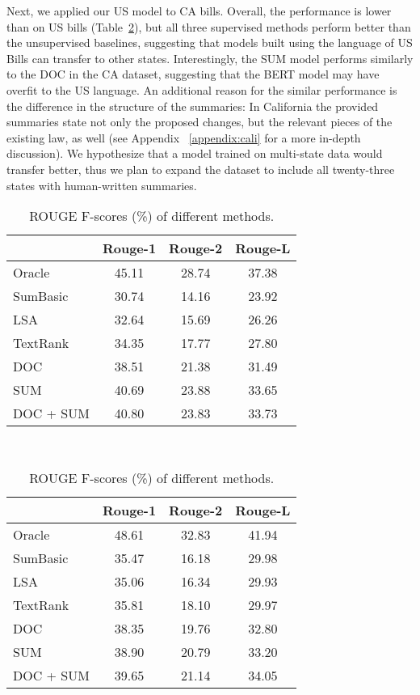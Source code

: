 \documentclass[11pt,a4paper]{article}
\begin{document}
Next, we applied our US model to CA bills. Overall, the performance is lower than on US bills (Table~\ref{tab:res:ca}), but all three supervised methods perform better than the unsupervised baselines, suggesting that models built using the language of US Bills can transfer to other states. Interestingly, the SUM model performs similarly to the DOC in the CA dataset, suggesting that the BERT model may have overfit to the US language. An additional reason for the similar performance is the difference in the structure of the summaries: In California the provided summaries state not only the proposed changes, but the relevant pieces of the existing law, as well (see Appendix ~\ref{appendix:cali} for a more in-depth discussion). We hypothesize that a model trained on multi-state data would transfer better, thus we plan to expand the dataset to include all twenty-three states with human-written summaries.

\begin{table}[h]
\caption{ROUGE F-scores (\%) of different methods.}\label{tab:res}
    \begin{tabular}{|l|c|c|c|}
    \hline
     &  Rouge-1 & Rouge-2 & Rouge-L \\ \hline
     Oracle & 45.11  & 28.74 & 37.38 \\
    \hline
    SumBasic &  30.74 & 14.16 & 23.92\\ 
    LSA &  32.64 & 15.69 & 26.26\\ 
    TextRank &  34.35 & 17.77 & 27.80\\ 
    \hline 
    DOC & 38.51 & 21.38 & 31.49 \\
    SUM &  40.69 & 23.88 & 33.65\\ 
    DOC + SUM &  40.80 & 23.83 & 33.73\\ 

    \hline
    \end{tabular}\\
  \label{tab:res:bill}
\begin{tabular}{|l|c|c|c|}
    \hline
     &  Rouge-1 & Rouge-2 & Rouge-L \\ \hline
    Oracle & 48.61 &  32.83 &  41.94 \\
    \hline
    SumBasic &  35.47 & 16.18 & 29.98\\ 
    LSA &  35.06 & 16.34 & 29.93\\ 
    TextRank &  35.81 & 18.10 & 29.97\\ 
    \hline 
    DOC &  38.35 & 19.76 & 32.80 \\ 
    SUM &  38.90 & 20.79  & 33.20 \\ 
    DOC + SUM &  39.65 & 21.14 & 34.05\\ 

    \hline
   
    \end{tabular}\\
    \label{tab:res:ca}
    \vspace{-7mm}
\end{table}
\end{document}

